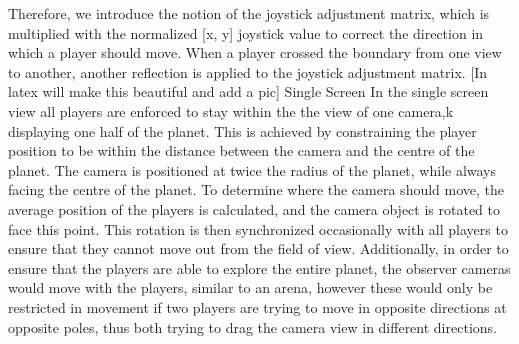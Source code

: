 \documentclass[11pt,a4paper]{article}
\begin{document}
   Therefore, we introduce the notion of the joystick adjustment matrix, which is multiplied with the normalized [x, y] joystick value to correct the direction in which a player should move. When a player crossed the boundary from one view to another, another reflection is applied to the joystick adjustment matrix. [In latex will make this beautiful and add a pic]
   Single Screen
    In the single screen view all players are enforced to stay within the the view of one camera,k displaying one half of the planet. This is achieved by constraining the player position to be within the distance between the camera and the centre of the planet. The camera is positioned at twice the radius of the planet, while always facing the centre of the planet. To determine where the camera should move, the average position of the players is calculated, and the camera object is rotated to face this point. This rotation is then synchronized occasionally with all players to ensure that they cannot move out from the field of view.
    Additionally, in order to ensure that the players are able to explore the entire planet, the observer cameras would move with the players, similar to an arena, however these would only be restricted in movement if two players are trying to move in opposite directions at opposite poles, thus both trying to drag the camera view in different directions.
\end{document}
